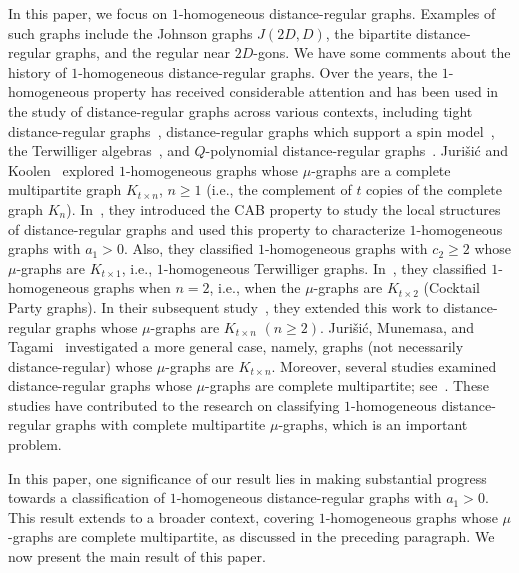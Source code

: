 In this paper, we focus on $1$-homogeneous distance-regular graphs.
Examples of such graphs include the Johnson graphs $J(2D, D)$, the bipartite distance-regular graphs, and the regular near $2D$-gons. 
We have some comments about the history of $1$-homogeneous distance-regular graphs.
Over the years, the $1$-homogeneous property has received considerable attention and has been used in the study of distance-regular graphs across various contexts, including tight distance-regular graphs~\cite{JKT2000, KLLLLT2023+}, distance-regular graphs which support a spin model~\cite{CurtinNomura2004}, the Terwilliger algebras~\cite{CurtinNomura2005}, and $Q$-polynomial distance-regular graphs~\cite{Miklavic2004}.
Juri\v{s}i\'{c} and Koolen~\cite{JK2000-1, JK2003, JK2011} explored $1$-homogeneous graphs whose $\mu$-graphs are a complete multipartite graph $K_{t\times n}$, $n\geqslant 1$ (i.e., the complement of $t$ copies of the complete graph $K_n$).
In~\cite{JK2000-1}, they introduced the CAB property to study the local structures of distance-regular graphs and used this property to characterize $1$-homogeneous graphs with $a_1 > 0$. 
Also, they classified $1$-homogeneous graphs with $c_2\geqslant 2$ whose $\mu$-graphs are $K_{t\times 1}$, i.e., $1$-homogeneous Terwilliger graphs.
In~\cite{JK2003}, they classified $1$-homogeneous graphs when $n=2$, i.e., when the $\mu$-graphs are $K_{t\times 2}$ (Cocktail Party graphs).
In their subsequent study~\cite{JK2007}, they extended this work to distance-regular graphs whose $\mu$-graphs are $K_{t\times n}$ $(n\geqslant 2)$.
Juri\v{s}i\'{c}, Munemasa, and Tagami~\cite{JMT2010} investigated a more general case, namely, graphs (not necessarily distance-regular) whose $\mu$-graphs are $K_{t\times n}$.
Moreover, several studies examined distance-regular graphs whose $\mu$-graphs are complete multipartite; see~\cite{JK2000-2,JK2011, KLLLLT2023+}.
These studies have contributed to the research on classifying $1$-homogeneous distance-regular graphs with complete multipartite $\mu$-graphs, which is an important problem.

In this paper, one significance of our result lies in making substantial progress towards a classification of $1$-homogeneous distance-regular graphs with $a_1 > 0$. 
This result extends to a broader context, covering $1$-homogeneous graphs whose $\mu$-graphs are complete multipartite, as discussed in the preceding paragraph.
We now present the main result of this paper.

